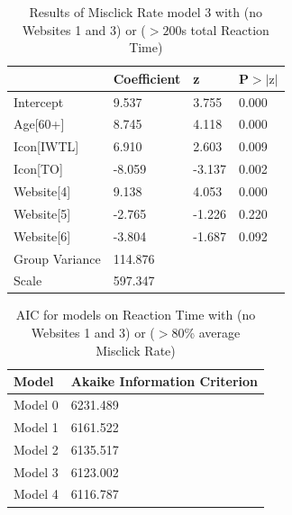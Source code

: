 \documentclass[12pt,twoside]{reedthesis}
\begin{document}
\begin{table}[h!]
        \centering
        \begin{tabular}{| p{5cm} | p{2.5cm} | p{2.5cm} | p{2.5cm} |}
            \hline
            & Coefficient & z & P$>|\text{z}|$\\
            \hline
            Intercept & 9.537 & 3.755 & 0.000\\
            \hline
            Age[60+] & 8.745 & 4.118 & 0.000\\
            \hline
            Icon[IWTL] & 6.910 & 2.603 & 0.009\\
            \hline
            Icon[TO] & -8.059 & -3.137 & 0.002\\
            \hline
            Website[4] & 9.138 & 4.053 & 0.000\\
            \hline
            Website[5] & -2.765 & -1.226 & 0.220\\
            \hline
            Website[6] & -3.804 & -1.687 & 0.092\\
            \hline
            Group Variance & 114.876 &&\\
            \hline
            Scale & 597.347 &&\\
            \hline
        \end{tabular}
        \caption{Results of Misclick Rate model 3 with (no Websites 1 and 3) or ($>200$s total Reaction Time)}
    \end{table}

\begin{table}[h!]
        \centering
        \begin{tabular}{| p{3.5cm} | p{7.5cm} |}
            \hline
            Model & Akaike Information Criterion\\
            \hline
            Model 0 & 6231.489\\
            \hline
            Model 1 & 6161.522\\
            \hline
            Model 2 & 6135.517\\
            \hline
            Model 3 & 6123.002\\
            \hline
            Model 4 & 6116.787\\
            \hline
        \end{tabular}
        \caption{AIC for models on Reaction Time with (no Websites 1 and 3) or ($>80$\% average Misclick Rate)}
    \end{table}
\end{document}
